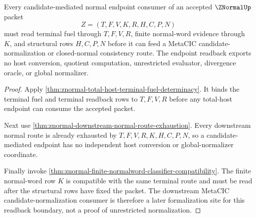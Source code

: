 \begin{theorem}
\label{thm:znormal-candidate-normal-endpoint-readback}
Every candidate-mediated normal endpoint consumer of an accepted $\ZNormalUp$ packet
$$
Z=(T,F,V,K,R,H,C,P,N)
$$
must read terminal fuel through $T,F,V,R$, finite normal-word evidence through $K$, and structural rows $H,C,P,N$ before it can feed a MetaCIC candidate-normalization or closed-normal consistency route. The endpoint readback exports no host conversion, quotient computation, unrestricted evaluator, divergence oracle, or global normalizer.
\end{theorem}
\begin{proof}
Apply \autoref{thm:znormal-total-host-terminal-fuel-determinacy}. It binds the terminal fuel and terminal readback rows to $T,F,V,R$ before any total-host endpoint can consume the accepted packet.

Next use \autoref{thm:znormal-downstream-normal-route-exhaustion}. Every downstream normal route is already exhausted by $T,F,V,R,K,H,C,P,N$, so a candidate-mediated endpoint has no independent host conversion or global-normalizer coordinate.

Finally invoke \autoref{thm:znormal-finite-normalword-classifier-compatibility}. The finite normal-word row $K$ is compatible with the same terminal route and must be read after the structural rows have fixed the packet. The downstream MetaCIC candidate-normalization consumer is therefore a later formalization site for this readback boundary, not a proof of unrestricted normalization.
\end{proof}
